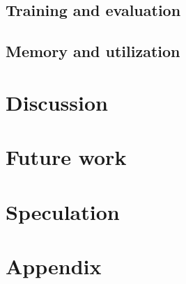 \documentclass[sigconf]{acmart}
\begin{document}
\subsection{Training and evaluation}\label{subsec:training-and-evaluation}

\subsection{Memory and utilization}\label{subsec:memory-and-utilization}

\section{Discussion}\label{sec:discussion}

\section{Future work}\label{sec:futurework}
\section{Speculation}\label{sec:speculation}




\appendix
\appendixpage
\addappheadtotoc

\section{Appendix}\label{sec:appendix}

%
\end{document}
